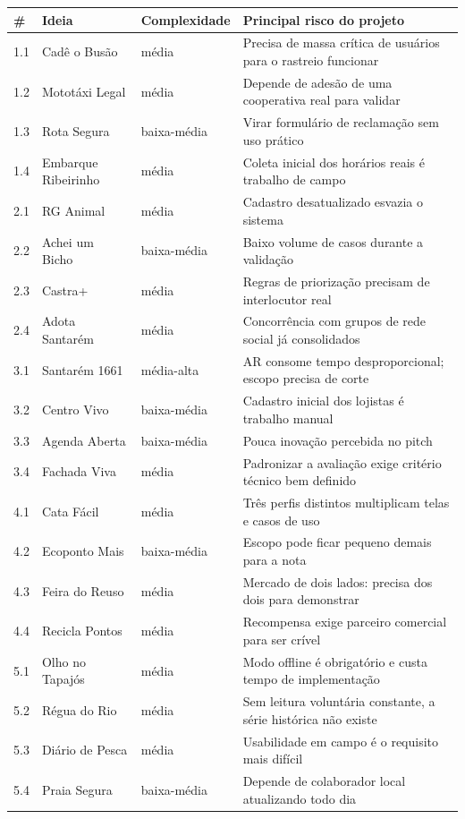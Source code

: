 \documentclass[11pt,a4paper]{article}
\begin{document}
\renewcommand{\arraystretch}{1.25}
{\small
\begin{tabular}{@{}p{0.5cm}p{5.4cm}p{2.4cm}p{6.6cm}@{}}
\hline
\textbf{\#} & \textbf{Ideia} & \textbf{Complexidade} & \textbf{Principal risco do projeto} \\
\hline
1.1 & Cadê o Busão & média & Precisa de massa crítica de usuários para o rastreio funcionar \\
1.2 & Mototáxi Legal & média & Depende de adesão de uma cooperativa real para validar \\
1.3 & Rota Segura & baixa-média & Virar formulário de reclamação sem uso prático \\
1.4 & Embarque Ribeirinho & média & Coleta inicial dos horários reais é trabalho de campo \\
2.1 & RG Animal & média & Cadastro desatualizado esvazia o sistema \\
2.2 & Achei um Bicho & baixa-média & Baixo volume de casos durante a validação \\
2.3 & Castra+ & média & Regras de priorização precisam de interlocutor real \\
2.4 & Adota Santarém & média & Concorrência com grupos de rede social já consolidados \\
3.1 & Santarém 1661 & média-alta & AR consome tempo desproporcional; escopo precisa de corte \\
3.2 & Centro Vivo & baixa-média & Cadastro inicial dos lojistas é trabalho manual \\
3.3 & Agenda Aberta & baixa-média & Pouca inovação percebida no pitch \\
3.4 & Fachada Viva & média & Padronizar a avaliação exige critério técnico bem definido \\
4.1 & Cata Fácil & média & Três perfis distintos multiplicam telas e casos de uso \\
4.2 & Ecoponto Mais & baixa-média & Escopo pode ficar pequeno demais para a nota \\
4.3 & Feira do Reuso & média & Mercado de dois lados: precisa dos dois para demonstrar \\
4.4 & Recicla Pontos & média & Recompensa exige parceiro comercial para ser crível \\
5.1 & Olho no Tapajós & média & Modo offline é obrigatório e custa tempo de implementação \\
5.2 & Régua do Rio & média & Sem leitura voluntária constante, a série histórica não existe \\
5.3 & Diário de Pesca & média & Usabilidade em campo é o requisito mais difícil \\
5.4 & Praia Segura & baixa-média & Depende de colaborador local atualizando todo dia \\
\hline
\end{tabular}
}
\end{document}
